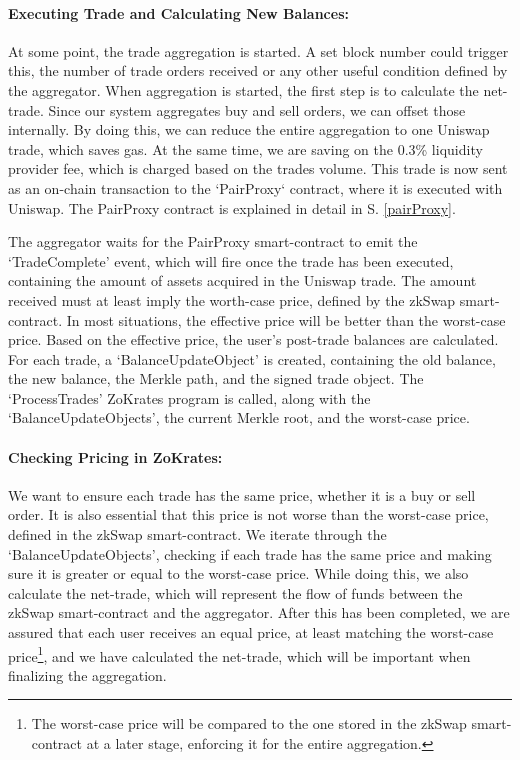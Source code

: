 \documentclass[../../thesis.tex]{subfiles}
\begin{document}
\paragraph{Executing Trade and Calculating New Balances:}
At some point, the trade aggregation is started. A set block number could trigger this, the number of trade orders received or any other useful condition defined by the aggregator. When aggregation is started, the first step is to calculate the net-trade. Since our system aggregates buy and sell orders, we can offset those internally. By doing this, we can reduce the entire aggregation to one Uniswap trade, which saves gas. At the same time, we are saving on the 0.3\% liquidity provider fee, which is charged based on the trades volume. This trade is now sent as an on-chain transaction to the `PairProxy` contract, where it is executed with Uniswap. The PairProxy contract is explained in detail in S. \ref{pairProxy}. 

The aggregator waits for the PairProxy smart-contract to emit the `TradeComplete' event, which will fire once the trade has been executed, containing the amount of assets acquired in the Uniswap trade. The amount received must at least imply the worth-case price, defined by the zkSwap smart-contract. In most situations, the effective price will be better than the worst-case price. Based on the effective price, the user's post-trade balances are calculated. For each trade, a `BalanceUpdateObject' is created, containing the old balance, the new balance, the Merkle path, and the signed trade object. The `ProcessTrades' ZoKrates program is called, along with the `BalanceUpdateObjects', the current Merkle root, and the worst-case price.

\paragraph{Checking Pricing in ZoKrates:}
We want to ensure each trade has the same price, whether it is a buy or sell order. It is also essential that this price is not worse than the worst-case price, defined in the zkSwap smart-contract. We iterate through the `BalanceUpdateObjects', checking if each trade has the same price and making sure it is greater or equal to the worst-case price. While doing this, we also calculate the net-trade, which will represent the flow of funds between the zkSwap smart-contract and the aggregator. After this has been completed, we are assured that each user receives an equal price, at least matching the worst-case price\footnote{The worst-case price will be compared to the one stored in the zkSwap smart-contract at a later stage, enforcing it for the entire aggregation.}, and we have calculated the net-trade, which will be important when finalizing the aggregation.
\end{document}

